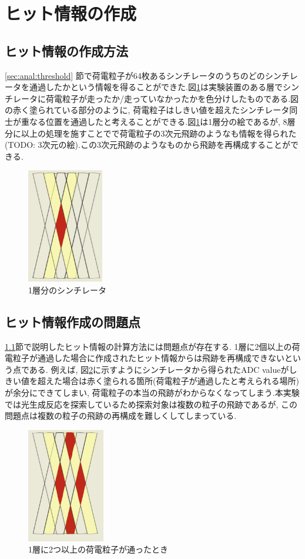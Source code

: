 \section{ヒット情報の作成}
\subsection{ヒット情報の作成方法}\label{subsec:anal:make_hit}
\ref{sec:anal:threshold} 節で荷電粒子が64枚あるシンチレータのうちのどのシンチレータを通過したかという情報を得ることができた.図\ref{fig:igata01}は実験装置のある層でシンチレータに荷電粒子が走ったか/走っていなかったかを色分けしたものである.図の赤く塗られている部分のように, 荷電粒子はしきい値を超えたシンチレータ同士が重なる位置を通過したと考えることができる.図\ref{fig:igata01}は1層分の絵であるが, 8層分に以上の処理を施すことでで荷電粒子の3次元飛跡のようなも情報を得られた(TODO: 3次元の絵).この3次元飛跡のようなものから飛跡を再構成することができる.
\begin{figure}[H]
    \centering
    \includegraphics[height=5.0cm]{img/igata_01.png}
    \caption{1層分のシンチレータ}
    \label{fig:igata01}
\end{figure}
\subsection{ヒット情報作成の問題点}
\ref{subsec:anal:make_hit}節で説明したヒット情報の計算方法には問題点が存在する.
1層に2個以上の荷電粒子が通過した場合に作成されたヒット情報からは飛跡を再構成できないという点である.
例えば, 図\ref{fig:igata02}に示すようにシンチレータから得られたADC valueがしきい値を超えた場合は赤く塗られる箇所(荷電粒子が通過したと考えられる場所)が余分にできてしまい, 荷電粒子の本当の飛跡がわからなくなってしまう.本実験では光生成反応を探索しているため探索対象は複数の粒子の飛跡であるが, この問題点は複数の粒子の飛跡の再構成を難しくしてしまっている.
\begin{figure}
    \centering
    \includegraphics[height=5.0cm]{img/igata_02.png}
    \caption{1層に2つ以上の荷電粒子が通ったとき}
    \label{fig:igata02}
\end{figure}

